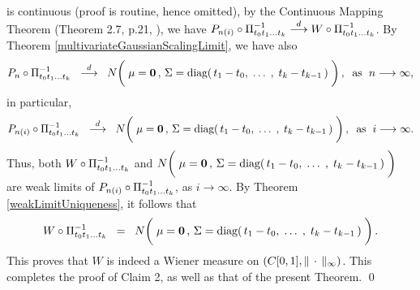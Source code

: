 is continuous (proof is routine, hence omitted),
by the Continuous Mapping Theorem (Theorem 2.7, p.21, \cite{Billingsley1999}),
we have
$P_{n(i)}\circ\Pi_{t_{0}t_{1}\ldots t_{k}}^{-1} \overset{d}{\longrightarrow} W\circ\Pi_{t_{0}t_{1}\ldots t_{k}}^{-1}$.
By Theorem \ref{multivariateGaussianScalingLimit}, we have also
\begin{equation*}
	P_{n}\circ\Pitzk^{-1}
	\;\; \overset{d}{\longrightarrow} \;\;
	N\!\left(\;
	\mathbf{\mu} = \mathbf{0}\,,\,
	\overset{{\color{white}1}}{\Sigma} = \diag\!\left(\,t_{1}-t_{0},\; \ldots\; ,\; t_{k}-t_{k-1}\,\right)
	\;\right),
	\;\;
	\textnormal{as \;$n \longrightarrow \infty$},
\end{equation*}
in particular,
\begin{equation*}
	P_{n(i)}\circ\Pitzk^{-1}
	\;\; \overset{d}{\longrightarrow} \;\;
	N\!\left(\;
	\mathbf{\mu} = \mathbf{0}\,,\,
	\overset{{\color{white}1}}{\Sigma} = \diag\!\left(\,t_{1}-t_{0},\; \ldots\; ,\; t_{k}-t_{k-1}\,\right)
	\;\right),
	\;\;
	\textnormal{as \;$i \longrightarrow \infty$}.
\end{equation*}
Thus, both \;$W\circ\Pi_{t_{0}t_{1}\ldots t_{k}}^{-1}$\; and 
\;$
N\!\left(\;
	\mathbf{\mu} = \mathbf{0}\,,\,
	\overset{{\color{white}1}}{\Sigma} = \diag\!\left(\,t_{1}-t_{0},\; \ldots\; ,\; t_{k}-t_{k-1}\,\right)
\;\right)
$\;
are weak limits of \;$P_{n(i)}\circ\Pi_{t_{0}t_{1}\ldots t_{k}}^{-1}$, as $i \longrightarrow \infty$.
By Theorem \ref{weakLimitUniqueness}, it follows that
\begin{equation*}
	W\circ\Pitzk^{-1}
	\;\; = \;\;
	N\!\left(\;
	\mathbf{\mu} = \mathbf{0}\,,\,
	\overset{{\color{white}1}}{\Sigma} = \diag\!\left(\,t_{1}-t_{0},\; \ldots\; ,\; t_{k}-t_{k-1}\,\right)
	\;\right).
\end{equation*}
This proves that $W$ is indeed a Wiener measure on $\left(C[0,1],\Vert\,\cdot\,\Vert_{\infty}\right)$.
This completes the proof of Claim 2, as well as that of the present Theorem.
\qed

